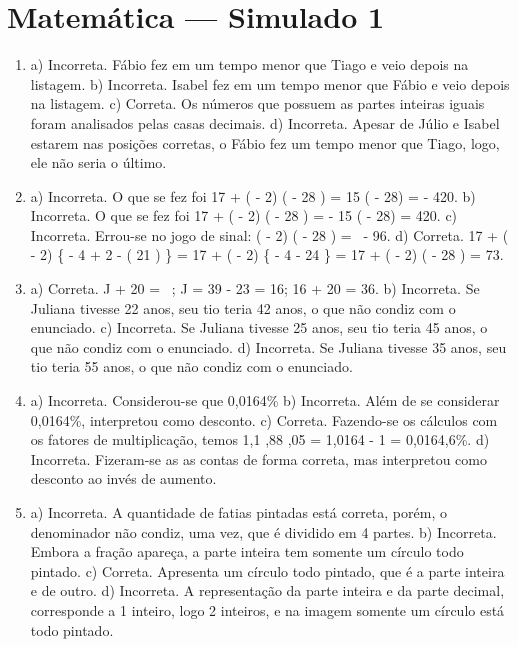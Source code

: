 \section*{Matemática — Simulado 1}
\begin{enumerate}
\item a) Incorreta. Fábio fez em um tempo menor que Tiago e veio depois na listagem.
b) Incorreta. Isabel fez em um tempo menor que Fábio e veio depois na listagem.
c) Correta. Os números que possuem as partes inteiras iguais foram analisados pelas casas decimais.
d) Incorreta. Apesar de Júlio e Isabel estarem nas posições corretas, o Fábio fez um tempo menor que Tiago, logo, ele não seria o último.

\item a) Incorreta. O que se fez foi
17 + ( - 2) \times \left( - 28 \right) = 15 \times ( - 28) = - 420.
b) Incorreta. O que se fez foi
17 + ( - 2) \times \left( - 28 \right) = - 15 \times ( - 28) = 420. 
c) Incorreta. Errou-se no jogo de sinal:
( - 2) \times \left( - 28 \right) = \  - 96.
d) Correta. 
17 + ( - 2) \times \left\{ - 4 + 2 \times \left{} - \left( 21 \right) \right\rbrack \right\} = 17 + ( - 2) \times \left\{ - 4 - 24 \right\} = 17 + ( - 2) \times \left( - 28 \right) = 73.


\item a) Correta. J + 20 = \ ; J = 39 - 23 = 16; 16 + 20 = 36.
b) Incorreta. Se Juliana tivesse 22 anos, seu tio teria 42 anos, o que não condiz com o enunciado.
c) Incorreta. Se Juliana tivesse 25 anos, seu tio teria 45 anos, o que não condiz com o enunciado.
d) Incorreta. Se Juliana tivesse 35 anos, seu tio teria 55 anos, o que não condiz com o enunciado.


\item a) Incorreta. Considerou-se que 0,0164\%
b) Incorreta. Além de se considerar 0,0164\%,
interpretou como desconto.
c) Correta. Fazendo-se os cálculos com os fatores de multiplicação,
temos 1,1 ,88 ,05 = 1,0164 - 1 = 0,0164,6\%.
d) Incorreta. Fizeram-se as as contas de forma correta, mas interpretou como desconto ao invés de aumento.

\item a) Incorreta. A quantidade de fatias pintadas está correta, porém, o denominador não condiz, uma vez, que é dividido em 4 partes.
b) Incorreta. Embora a fração  apareça, a parte inteira tem somente um círculo todo pintado.
c) Correta. Apresenta um círculo todo pintado, que é a parte inteira e  de outro.
d) Incorreta. A representação da parte inteira e da parte decimal, corresponde a 1 inteiro, logo 2 inteiros, e na imagem somente um círculo está todo pintado.



\end{enumerate}
